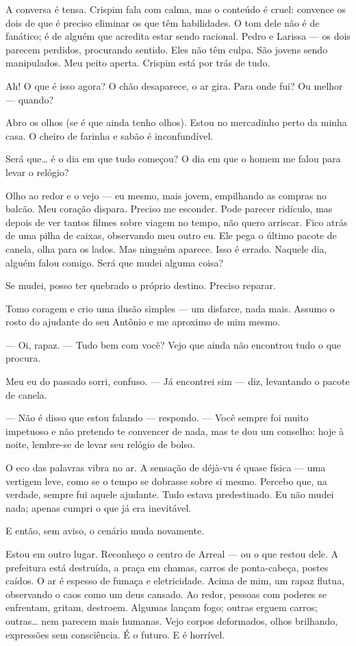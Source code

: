 A conversa é tensa. Crispim fala com calma, mas o conteúdo é cruel: convence os dois de que é preciso eliminar os que têm habilidades.  
O tom dele não é de fanático; é de alguém que acredita estar sendo racional.  
Pedro e Larissa — os dois parecem perdidos, procurando sentido.  
Eles não têm culpa. São jovens sendo manipulados.  
Meu peito aperta.  
Crispim está por trás de tudo.

Ah! O que é isso agora?  
O chão desaparece, o ar gira.  
Para onde fui? Ou melhor — quando?

Abro os olhos (se é que ainda tenho olhos).  
Estou no mercadinho perto da minha casa.  
O cheiro de farinha e sabão é inconfundível.  

Será que… é o dia em que tudo começou?  
O dia em que o homem me falou para levar o relógio?

Olho ao redor e o vejo — eu mesmo, mais jovem, empilhando as compras no balcão.  
Meu coração dispara.  
Preciso me esconder.  
Pode parecer ridículo, mas depois de ver tantos filmes sobre viagem no tempo, não quero arriscar.  
Fico atrás de uma pilha de caixas, observando meu outro eu.  
Ele pega o último pacote de canela, olha para os lados.  
Mas ninguém aparece.  
Isso é errado.  
Naquele dia, alguém falou comigo.  
Será que mudei alguma coisa?

Se mudei, posso ter quebrado o próprio destino.  
Preciso reparar.

Tomo coragem e crio uma ilusão simples — um disfarce, nada mais.  
Assumo o rosto do ajudante do seu Antônio e me aproximo de mim mesmo.

— Oi, rapaz.  
— Tudo bem com você? Vejo que ainda não encontrou tudo o que procura.

Meu eu do passado sorri, confuso.  
— Já encontrei sim — diz, levantando o pacote de canela.

— Não é disso que estou falando — respondo. — Você sempre foi muito impetuoso e não pretendo te convencer de nada, mas te dou um conselho: hoje à noite, lembre-se de levar seu relógio de bolso.

O eco das palavras vibra no ar.  
A sensação de déjà-vu é quase física — uma vertigem leve, como se o tempo se dobrasse sobre si mesmo.  
Percebo que, na verdade, sempre fui aquele ajudante.  
Tudo estava predestinado.  
Eu não mudei nada; apenas cumpri o que já era inevitável.

E então, sem aviso, o cenário muda novamente.

Estou em outro lugar.  
Reconheço o centro de Arreal — ou o que restou dele.
A prefeitura está destruída, a praça em chamas, carros de ponta-cabeça, postes caídos. O ar é espesso de fumaça e eletricidade.  
Acima de mim, um rapaz flutua, observando o caos como um deus cansado.  
Ao redor, pessoas com poderes se enfrentam, gritam, destroem.  
Algumas lançam fogo; outras erguem carros; outras… nem parecem mais humanas.  
Vejo corpos deformados, olhos brilhando, expressões sem consciência.  
É o futuro.  
E é horrível.


